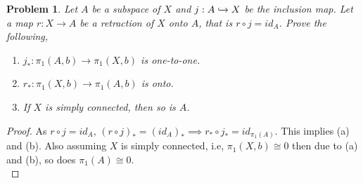 \documentclass[paper=a4, fontsize=11pt]{scrartcl}
\newtheorem{problem}{Problem}
\begin{document}
\begin{problem}
	Let $A$ be a subspace of $X$ and $j:A\xhookrightarrow{}X$ be the inclusion map. Let a map $r:X\to A$ be a retraction of $X$ onto  $A$, that is $r \circ j = id_A$. Prove the following,
	\begin{enumerate}[label=(\alph*)]
		\item $j_*:\pi_1(A,b)\to \pi_1(X,b)$ is one-to-one.		
		\item $r_*:\pi_1(X,b)\to \pi_1(A,b)$ is onto.
		\item If $X$ is simply connected, then so is $A$.\\
	\end{enumerate}
\end{problem}

\begin{proof}
	As $r \circ j = id_A$, $(r \circ j)_* = (id_A)_* \implies r_* \circ j_* = id_{\pi_1(A)}$. This implies (a) and (b). Also assuming $X$ is simply connected, i.e, $\pi_1(X,b) \cong 0$ then due to (a) and (b), so does $\pi_1(A) \cong 0$.\\
\end{proof}
\end{document}
